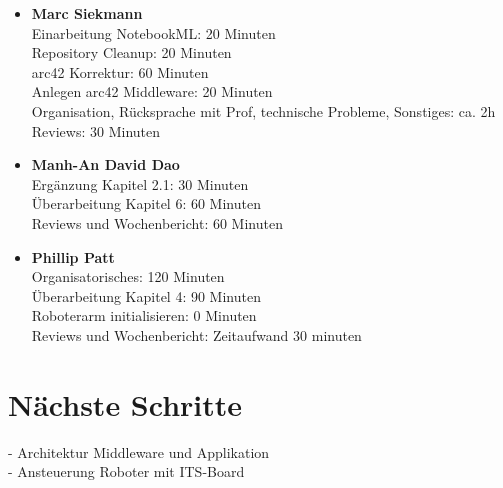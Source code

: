 \documentclass{article}
\begin{document}
\begin{itemize}
\item \textbf{Marc Siekmann} \\
Einarbeitung NotebookML: 20 Minuten\\
Repository Cleanup: 20 Minuten\\
arc42 Korrektur: 60 Minuten\\
Anlegen arc42 Middleware: 20 Minuten\\
Organisation, Rücksprache mit Prof, technische Probleme, Sonstiges: ca. 2h\\
Reviews: 30 Minuten

\item \textbf{Manh-An David Dao}\\
Ergänzung Kapitel 2.1: 30 Minuten\\
Überarbeitung Kapitel 6: 60 Minuten\\
Reviews und Wochenbericht: 60 Minuten\\ 

\item \textbf{Phillip Patt}\\
Organisatorisches: 120 Minuten \\ 
Überarbeitung Kapitel 4: 90 Minuten \\ 
Roboterarm initialisieren: 0 Minuten\\ 
Reviews und Wochenbericht: Zeitaufwand 30 minuten \\

\end{itemize}


\section{Nächste Schritte}
- Architektur Middleware und Applikation\\
- Ansteuerung Roboter mit ITS-Board
\end{document}
